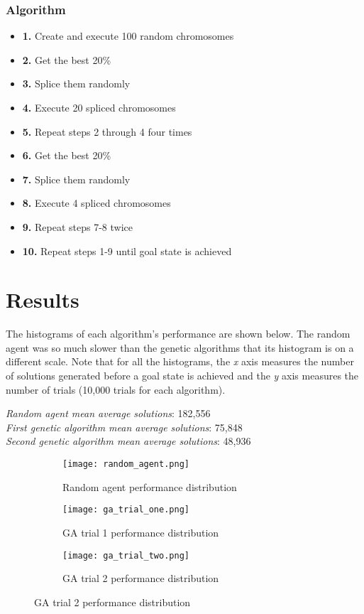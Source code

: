 \documentclass[a4paper]{article}
\begin{document}
\subsubsection{Algorithm}

\begin{itemize}
    \item \textbf{1.} Create and execute 100 random chromosomes
    \item \textbf{2.} Get the best 20\%
    \item \textbf{3.} Splice them randomly
    \item \textbf{4.} Execute 20 spliced chromosomes
    \item \textbf{5.} Repeat steps 2 through 4 four times
    \item \textbf{6.} Get the best 20\%
    \item \textbf{7.} Splice them randomly
    \item \textbf{8.} Execute 4 spliced chromosomes
    \item \textbf{9.} Repeat steps 7-8 twice
    \item \textbf{10.} Repeat steps 1-9 until goal state is achieved
\end{itemize}

\section{Results}
The histograms of each algorithm's performance are shown below. The random agent was so much slower than the genetic algorithms that its histogram is on a different scale. Note that for all the histograms, the \textit{x} axis measures the number of solutions generated before a goal state is achieved and the \textit{y} axis measures the number of trials (10,000 trials for each algorithm).
\begin{center}
    \textit{Random agent mean average solutions}: 182,556\\
    \textit{First genetic algorithm mean average solutions}: 75,848\\
    \textit{Second genetic algorithm mean average solutions}: 48,936\\
\end{center}
\begin{figure}[h!]
\begin{subfigure}
    \centering
        \texttt{[image: random\_agent.png]}
        \caption{Random agent performance distribution}
        \label{ra}
\end{subfigure}
\begin{subfigure}
    \centering
        \texttt{[image: ga\_trial\_one.png]}
        \caption{GA trial 1 performance distribution}
        \label{ga1}
\end{subfigure}
\begin{subfigure}{\linewidth}
    \centering
        \texttt{[image: ga\_trial\_two.png]}
        \caption{GA trial 2 performance distribution}
        \label{ga2}
\end{subfigure}
\end{figure}
\end{document}
